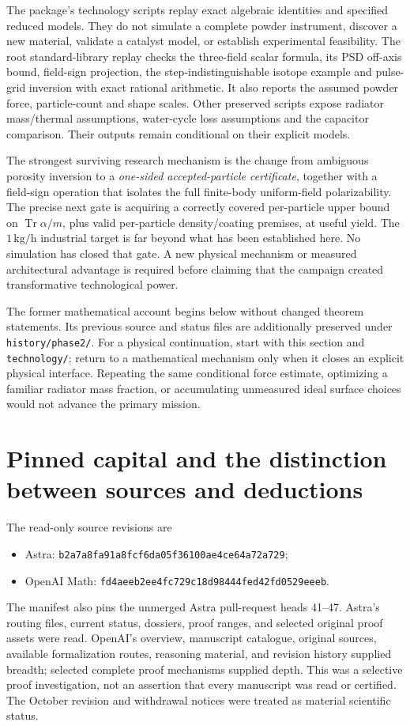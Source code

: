 \documentclass[11pt]{article}
\newcommand{\Tr}{\operatorname{Tr}}
\begin{document}
The package's technology scripts replay exact algebraic identities and specified reduced models. They do not simulate a complete powder instrument, discover a new material, validate a catalyst model, or establish experimental feasibility. The root standard-library replay checks the three-field scalar formula, its PSD off-axis bound, field-sign projection, the step-indistinguishable isotope example and pulse-grid inversion with exact rational arithmetic. It also reports the assumed powder force, particle-count and shape scales. Other preserved scripts expose radiator mass/thermal assumptions, water-cycle loss assumptions and the capacitor comparison. Their outputs remain conditional on their explicit models.

The strongest surviving research mechanism is the change from ambiguous porosity inversion to a \emph{one-sided accepted-particle certificate}, together with a field-sign operation that isolates the full finite-body uniform-field polarizability. The precise next gate is acquiring a correctly covered per-particle upper bound on $\Tr\alpha/m$, plus valid per-particle density/coating premises, at useful yield. The $1\,\mathrm{kg/h}$ industrial target is far beyond what has been established here. No simulation has closed that gate. A new physical mechanism or measured architectural advantage is required before claiming that the campaign created transformative technological power.

The former mathematical account begins below without changed theorem statements. Its previous source and status files are additionally preserved under \texttt{history/phase2/}. For a physical continuation, start with this section and \texttt{technology/}; return to a mathematical mechanism only when it closes an explicit physical interface. Repeating the same conditional force estimate, optimizing a familiar radiator mass fraction, or accumulating unmeasured ideal surface choices would not advance the primary mission.


\section{Pinned capital and the distinction between sources and deductions}

The read-only source revisions are
\begin{itemize}
\item Astra: \texttt{b2a7a8fa91a8fcf6da05f36100ae4ce64a72a729};
\item OpenAI Math: \texttt{fd4aeeb2ee4fc729c18d98444fed42fd0529eeeb}.
\end{itemize}
The manifest also pins the unmerged Astra pull-request heads 41--47. Astra's routing files, current status, dossiers, proof ranges, and selected original proof assets were read. OpenAI's overview, manuscript catalogue, original sources, available formalization routes, reasoning material, and revision history supplied breadth; selected complete proof mechanisms supplied depth. This was a selective proof investigation, not an assertion that every manuscript was read or certified. The October revision and withdrawal notices were treated as material scientific status.
\end{document}
